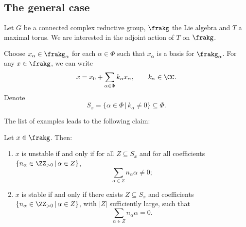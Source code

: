 
\subsection{The general case}
Let $G$ be a connected complex reductive group, $\frakg$ the Lie algebra and $T$ a maximal torus.
We are interested in the adjoint action of $T$ on $\frakg$.

Choose $x_\alpha \in \frakg_\alpha$ for each $\alpha \in \Phi$ such that $x_\alpha$ is a basis for $\frakg_\alpha$.
For any $x \in \frakg$, we can write
$$x = x_0 + \sum_{\alpha \in \Phi} k_\alpha x_\alpha, \qquad k_\alpha \in \CC.$$
Denote
$$S_x = \{\alpha \in \Phi \, | \, k_\alpha \ne 0\} \subseteq \Phi.$$

The list of examples leads to the following claim:

\begin{claim}
Let $x \in \frakg$.
Then:
\begin{enumerate}[label=(\roman*)]
\item
$x$ is unstable if and only if for all $Z \subseteq S_x$ and for all coefficients $\{n_\alpha \in \ZZ_{>0} \, | \, \alpha \in Z\}$, 
$$\sum_{\alpha \in Z} n_\alpha \alpha \ne 0;$$

\item
$x$ is stable if and only if there exists $Z \subseteq S_x$ and coefficients $\{n_\alpha \in \ZZ_{>0} \, | \, \alpha \in Z\}$, with $|Z|$ sufficiently large, such that
$$\sum_{\alpha \in Z} n_\alpha \alpha = 0.$$
\end{enumerate}
\end{claim}

